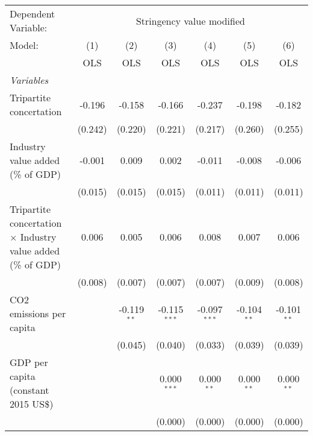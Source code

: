 
\begingroup
\centering
\begin{tabular}{lcccccc}
   \toprule
   Dependent Variable: & \multicolumn{6}{c}{Stringency value modified}\\
   Model:                                                              & (1)     & (2)           & (3)            & (4)            & (5)            & (6)\\  
                                                                       &  OLS    & OLS           & OLS            & OLS            & OLS            & OLS\\  
   \midrule
   \emph{Variables}\\
   Tripartite concertation                                             & -0.196  & -0.158        & -0.166         & -0.237         & -0.198         & -0.182\\   
                                                                       & (0.242) & (0.220)       & (0.221)        & (0.217)        & (0.260)        & (0.255)\\   
   Industry value added (\% of GDP)                                    & -0.001  & 0.009         & 0.002          & -0.011         & -0.008         & -0.006\\   
                                                                       & (0.015) & (0.015)       & (0.015)        & (0.011)        & (0.011)        & (0.011)\\   
   Tripartite concertation $\times$ Industry value added (\% of GDP)   & 0.006   & 0.005         & 0.006          & 0.008          & 0.007          & 0.006\\   
                                                                       & (0.008) & (0.007)       & (0.007)        & (0.007)        & (0.009)        & (0.008)\\   
   CO2 emissions per capita                                            &         & -0.119$^{**}$ & -0.115$^{***}$ & -0.097$^{***}$ & -0.104$^{**}$  & -0.101$^{**}$\\   
                                                                       &         & (0.045)       & (0.040)        & (0.033)        & (0.039)        & (0.039)\\   
   GDP per capita (constant 2015 US\$)                                 &         &               & 0.000$^{***}$  & 0.000$^{**}$   & 0.000$^{**}$   & 0.000$^{**}$\\   
                                                                       &         &               & (0.000)        & (0.000)        & (0.000)        & (0.000)\\   

\end{tabular}
